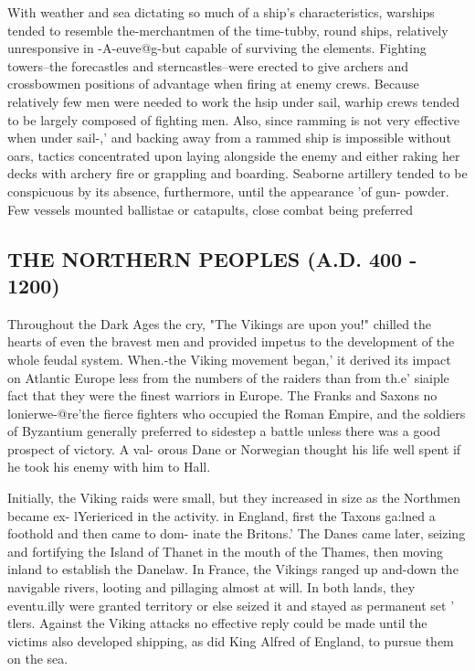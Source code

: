 \documentclass{article}
\begin{document}
\begin{multicols}{2}
With weather and sea dictating so much of a ship's characteristics,
warships tended to resemble the-merchantmen of the time-tubby, round
ships, relatively unresponsive in -A-euve@g-but capable of surviving
the elements.  Fighting towers--the forecastles and sterncastles--were
erected to give archers and crossbowmen positions of advantage when
firing at enemy crews. Because relatively few men were needed to work
the hsip under sail, warhip crews tended to be largely composed of
fighting men. Also, since ramming is not very effective when under
sail-,' and backing away from a rammed ship is impossible without
oars, tactics concentrated upon laying alongside the enemy and either
raking her decks with archery fire or grappling and boarding.
Seaborne artillery tended to be conspicuous by its absence,
furthermore, until the appearance 'of gun- powder.  Few vessels
mounted ballistae or catapults, close combat being preferred


\subsection{THE NORTHERN PEOPLES (A.D. 400 - 1200)}

Throughout the Dark Ages the cry, "The Vikings are upon you!"  chilled
the hearts of even the bravest men and provided impetus to the
development of the whole feudal system.  When.-the Viking movement
began,' it derived its impact on Atlantic Europe less from the numbers
of the raiders than from th.e' siaiple fact that they were the finest
warriors in Europe.  The Franks and Saxons no lonierwe-@re'the fierce
fighters who occupied the Roman Empire, and the soldiers of Byzantium
generally preferred to sidestep a battle unless there was a good
prospect of victory.  A val- orous Dane or Norwegian thought his life
well spent if he took his enemy with him to Hall.

Initially, the Viking raids were small, but they increased in size as
the Northmen became ex- lYeriericed in the activity. in England, first
the Taxons ga:lned a foothold and then came to dom- inate the
Britons.' The Danes came later, seizing and fortifying the Island of
Thanet in the mouth of the Thames, then moving inland to establish the
Danelaw.  In France, the Vikings ranged up and-down the navigable
rivers, looting and pillaging almost at will.  In both lands, they
eventu.illy were granted territory or else seized it and stayed as
permanent set ' tlers.  Against the Viking attacks no effective reply
could be made until the victims also developed shipping, as did King
Alfred of England, to pursue them on the sea.


\end{multicols}
\end{document}
